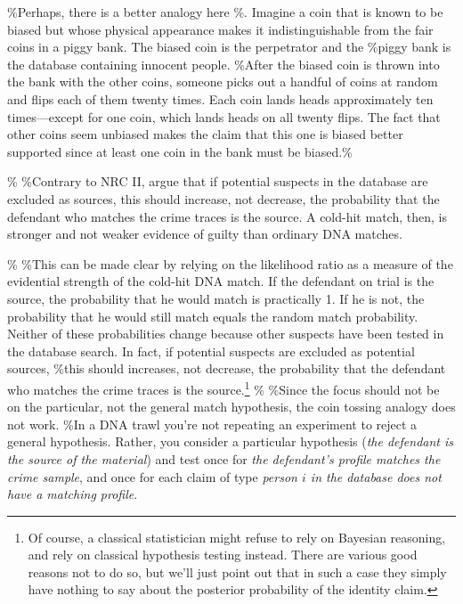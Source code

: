 \documentclass[10pt,dvipsnames,enabledeprecatedfontcommands]{scrartcl}
\begin{document}
\%Perhaps, there is a better analogy here
\%\citep[p.\ 950]{donnelly1999DNADatabaseSearches}. Imagine a coin that
is known to be biased but whose physical appearance makes it
indistinguishable from the fair coins in a piggy bank. The biased coin
is the perpetrator and the \%piggy bank is the database containing
innocent people. \%After the biased coin is thrown into the bank with
the other coins, someone picks out a handful of coins at random and
flips each of them twenty times. Each coin lands heads approximately ten
times---except for one coin, which lands heads on all twenty flips. The
fact that other coins seem unbiased makes the claim that this one is
biased better supported since at least one coin in the bank must be
biased.\%

\% \%Contrary to NRC II, \cite{donnelly1999DNADatabaseSearches} argue
that if potential suspects in the database are excluded as sources, this
should increase, not decrease, the probability that the defendant who
matches the crime traces is the source. A cold-hit match, then, is
stronger and not weaker evidence of guilty than ordinary DNA matches.

\% \%This can be made clear by relying on the likelihood ratio as a
measure of the evidential strength of the cold-hit DNA match. If the
defendant on trial is the source, the probability that he would match is
practically 1. If he is not, the probability that he would still match
equals the random match probability. Neither of these probabilities
change because other suspects have been tested in the database search.
In fact, if potential suspects are excluded as potential sources, \%this
should increases, not decrease, the probability that the defendant who
matches the crime traces is the
source.\footnote{Of course, a classical statistician might refuse to rely on Bayesian reasoning, and rely on classical hypothesis testing instead. There are various good reasons not to do so, but we'll just point out that in such a case they simply have nothing to say about the posterior probability of the identity claim.}
\% \%Since the focus should not be on the particular, not the general
match hypothesis, the coin tossing analogy does not work. \%In a DNA
trawl you're not repeating an experiment to reject a general hypothesis.
Rather, you consider a particular hypothesis
(\emph{the defendant is the source of the material}) and test once for
\emph{the defendant's profile matches the crime sample}, and once for
each claim of type
\emph{person $i$ in the database does not have a matching profile}.
\end{document}
